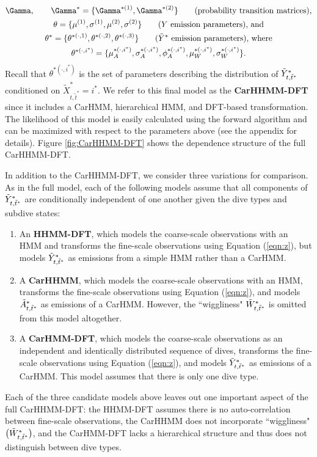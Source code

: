 \begin{gather*}
    \Gamma, \qquad \Gamma^{*} = \{\Gamma^{*(1)},\Gamma^{*(2)}\} \qquad \text{(probability transition matrices)}, \\
    \theta = \{\mu^{(1)},\sigma^{(1)},\mu^{(2)},\sigma^{(2)}\} \qquad \text{($Y$ emission parameters), and} \\
    \theta^* = \{\theta^{*(\cdot,1)},\theta^{*(\cdot,2)},\theta^{*(\cdot,3)}\}  \qquad \text{($\Z$ emission parameters), where} \\
    \theta^{*(\cdot,i^*)} =  \{\mu_A^{*(\cdot,i^*)},\sigma_A^{*(\cdot,i^*)},\phi_A^{*(\cdot,i^*)},\mu_W^{*(\cdot,i^*)},\sigma_W^{*(\cdot,i^*)}\}.
\end{gather*}
%
Recall that $\theta^{*(\cdot,i^*)}$ is the set of parameters describing the distribution of $\tilde{Y}^*_{t,\tilde t^*}$ conditioned on $\tilde X^*_{t,\tilde t^*} = i^*$. 
%
We refer to this final model as the \textbf{CarHHMM-DFT} since it includes a CarHMM, hierarchical HMM, and DFT-based transformation. The likelihood of this model is easily calculated using the forward algorithm and can be maximized with respect to the parameters above (see the appendix for details). Figure \ref{fig:CarHHMM-DFT} shows the dependence structure of the full CarHHMM-DFT.

In addition to the CarHHMM-DFT, we consider three variations for comparison. As in the full model, each of the following models assume that all components of $\tilde{Y}^*_{t,\tilde t^*}$ are conditionally independent of one another given the dive types and subdive states:
\begin{enumerate}
    \item An \textbf{HHMM-DFT}, which models the coarse-scale observations with an HMM and transforms the fine-scale observations using Equation (\ref{eqn:z}), but models $\tilde{Y}^*_{t,\tilde t^*}$ as emissions from a simple HMM rather than a CarHMM.
    \item A \textbf{CarHHMM}, which models the coarse-scale observations with an HMM, transforms the fine-scale observations using Equation (\ref{eqn:z}), and models $\tilde{A}^*_{t,\tilde t^*}$ as emissions of a CarHMM. However, the ``wiggliness"  $\tilde{W}^*_{t,\tilde t^*}$ is omitted from this model altogether.
    \item A \textbf{CarHMM-DFT}, which models the coarse-scale observations as an independent and identically distributed sequence of dives, transforms the fine-scale observations using Equation (\ref{eqn:z}), and models $\tilde{Y}^*_{t,\tilde t^*}$ as emissions of a CarHMM. This model assumes that there is only one dive type.
\end{enumerate}
%
Each of the three candidate models above leaves out one important aspect of the full CarHHMM-DFT: the HHMM-DFT assumes there is no auto-correlation between fine-scale observations, the CarHHMM does not incorporate ``wiggliness" $\big(\tilde{W}^*_{t,\tilde t^*}\big)$, and the CarHMM-DFT lacks a hierarchical structure and thus does not distinguish between dive types.

